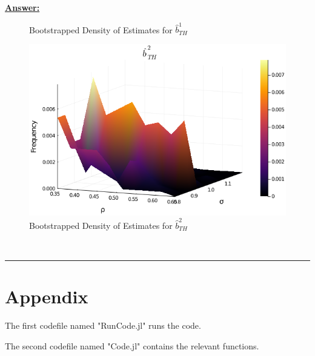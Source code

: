 \documentclass{article} %
\theoremstyle{definition}
\newenvironment{solution}[1][Answer]{\begin{singlespace}\underline{\textbf{#1:}}\quad }{\ \rule{0.3em}{0.3em}\end{singlespace}} %
\begin{document}
\begin{enumerate}
\begin{solution}
\begin{figure}[htbp]
				\caption{Bootstrapped Density of Estimates for $\hat{b}^{1}_{TH}$ \label{6e1}}
			\end{figure}
			\begin{figure}[htbp] 
				\centering
				\includegraphics[scale=.5]{Figures/Exercise6Bootstrapping2.png}
				\caption{Bootstrapped Density of Estimates for $\hat{b}^{2}_{TH}$ \label{6e2}}
			\end{figure}
		\end{solution}
		
	
	\end{enumerate}

	\newpage
	\section*{Appendix}
 	The first codefile named "RunCode.jl" runs the code.
	
 	The second codefile named "Code.jl" contains the relevant functions.
\end{document}

